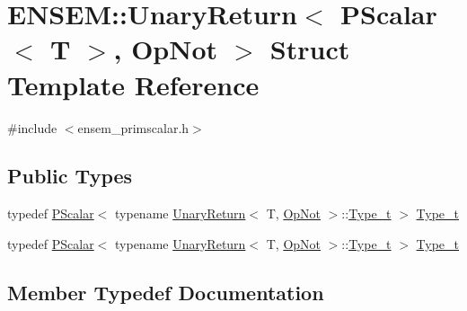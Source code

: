 \hypertarget{structENSEM_1_1UnaryReturn_3_01PScalar_3_01T_01_4_00_01OpNot_01_4}{}\section{E\+N\+S\+EM\+:\+:Unary\+Return$<$ P\+Scalar$<$ T $>$, Op\+Not $>$ Struct Template Reference}
\label{structENSEM_1_1UnaryReturn_3_01PScalar_3_01T_01_4_00_01OpNot_01_4}


{\ttfamily \#include $<$ensem\+\_\+primscalar.\+h$>$}

\subsection*{Public Types}
\begin{DoxyCompactItemize}
\item 
typedef \mbox{\hyperlink{classENSEM_1_1PScalar}{P\+Scalar}}$<$ typename \mbox{\hyperlink{structENSEM_1_1UnaryReturn}{Unary\+Return}}$<$ T, \mbox{\hyperlink{structENSEM_1_1OpNot}{Op\+Not}} $>$\+::\mbox{\hyperlink{structENSEM_1_1UnaryReturn_3_01PScalar_3_01T_01_4_00_01OpNot_01_4_a7612702a79b74f223457b785dbd77b2b}{Type\+\_\+t}} $>$ \mbox{\hyperlink{structENSEM_1_1UnaryReturn_3_01PScalar_3_01T_01_4_00_01OpNot_01_4_a7612702a79b74f223457b785dbd77b2b}{Type\+\_\+t}}
\item 
typedef \mbox{\hyperlink{classENSEM_1_1PScalar}{P\+Scalar}}$<$ typename \mbox{\hyperlink{structENSEM_1_1UnaryReturn}{Unary\+Return}}$<$ T, \mbox{\hyperlink{structENSEM_1_1OpNot}{Op\+Not}} $>$\+::\mbox{\hyperlink{structENSEM_1_1UnaryReturn_3_01PScalar_3_01T_01_4_00_01OpNot_01_4_a7612702a79b74f223457b785dbd77b2b}{Type\+\_\+t}} $>$ \mbox{\hyperlink{structENSEM_1_1UnaryReturn_3_01PScalar_3_01T_01_4_00_01OpNot_01_4_a7612702a79b74f223457b785dbd77b2b}{Type\+\_\+t}}
\end{DoxyCompactItemize}


\subsection{Member Typedef Documentation}
\mbox{\label{structENSEM_1_1UnaryReturn_3_01PScalar_3_01T_01_4_00_01OpNot_01_4_a7612702a79b74f223457b785dbd77b2b}} 
